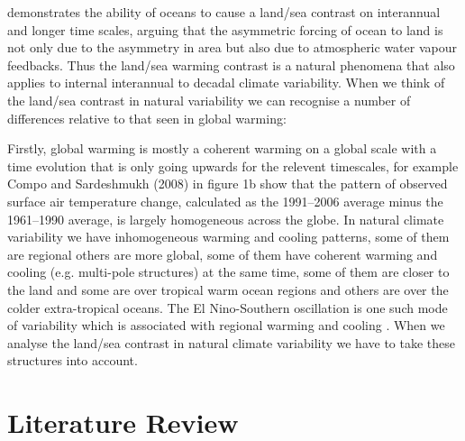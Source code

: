 \citet{Dommenget2009} demonstrates the ability of oceans to cause a land/sea 
contrast on interannual and longer time scales, arguing that the asymmetric 
forcing of ocean to land is not only due to the asymmetry in area but also due 
to atmospheric water vapour feedbacks. Thus the land/sea warming contrast is a 
natural phenomena that also applies to internal interannual to decadal climate 
variability. When we think of the land/sea contrast in natural variability we 
can recognise a number of differences relative to that seen in global warming: 

Firstly, global warming is mostly a coherent warming on a global scale with a 
time evolution that is only going upwards for the relevent timescales, for 
example Compo and Sardeshmukh (2008) in figure 1b show that the pattern of 
observed surface air temperature change, calculated as the 1991--2006 average 
minus the 1961--1990 average, is largely homogeneous across the globe. In 
natural climate variability we have inhomogeneous warming and cooling patterns, 
some of them are regional others are more global, some of them have coherent 
warming and cooling (e.g. multi-pole structures) at the same time, some of them 
are closer to the land and some are over tropical warm ocean regions and others 
are over the colder extra-tropical oceans. The El Nino-Southern oscillation is 
one such mode of variability which is associated with regional warming and 
cooling \citep{Halpert1992}. When we analyse the land/sea contrast in natural 
climate variability we have to take these structures into account.


\section{Literature Review}

